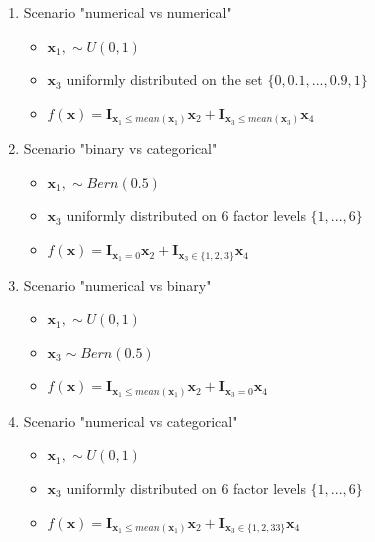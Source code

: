 \begin{enumerate}
    \item Scenario "numerical vs numerical"
    \begin{itemize}
        \item $\textbf{x}_{1}, \sim U(0,1)$
        \item $\textbf{x}_3$ uniformly distributed on the set $\{0, 0.1,..., 0.9, 1\}$
        \item $f(\textbf{x})= \mathbf{I}_{\textbf{x}_1 \leq  mean(\textbf{x}_1)}\textbf{x}_2  +  \mathbf{I}_{\textbf{x}_3 \leq  mean(\textbf{x}_3)}\textbf{x}_4 $        
    \end{itemize}

    \item Scenario "binary vs categorical"
    \begin{itemize}
        \item $\textbf{x}_{1}, \sim Bern(0.5)$
        \item $\textbf{x}_3$ uniformly distributed on 6 factor levels 
        $\{1,...,6\}$
        \item $f(\textbf{x})= \mathbf{I}_{\textbf{x}_1 = 0}\textbf{x}_2  +  \mathbf{I}_{\textbf{x}_3 \in \{1,2,3\}}\textbf{x}_4 $        
    \end{itemize}

    \item Scenario "numerical vs binary"
    \begin{itemize}
        \item $\textbf{x}_{1}, \sim U(0,1)$
        \item $\textbf{x}_3 \sim Bern(0.5)$ 
        \item $f(\textbf{x})= \mathbf{I}_{\textbf{x}_1 \leq  mean(\textbf{x}_1)}\textbf{x}_2  +  \mathbf{I}_{\textbf{x}_3 = 0}\textbf{x}_4 $        
    \end{itemize}

    \item Scenario "numerical vs categorical"
    \begin{itemize}
        \item $\textbf{x}_{1}, \sim U(0,1)$
        \item $\textbf{x}_3$ uniformly distributed on 6 factor levels 
        $\{1,...,6\}$
        \item $f(\textbf{x})= \mathbf{I}_{\textbf{x}_1 \leq  mean(\textbf{x}_1)}\textbf{x}_2  +  \mathbf{I}_{\textbf{x}_3 \in \{1,2,33\}}\textbf{x}_4 $        
    \end{itemize}

    
\end{enumerate}

